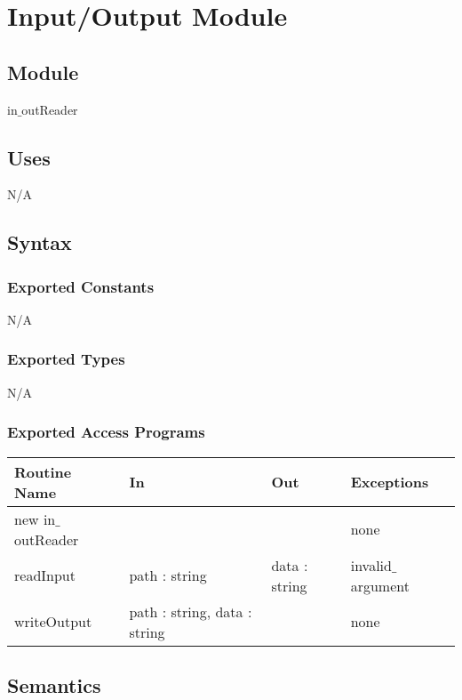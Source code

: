 \documentclass{article}
\begin{document}
\newpage

\section* {Input/Output Module}

\subsection* {Module}
in$\_$outReader

\subsection* {Uses}
N/A

\subsection* {Syntax}

\subsubsection* {Exported Constants}
N/A

\subsubsection* {Exported Types}
N/A
\subsubsection* {Exported Access Programs}

\begin{table}[!ht]
    \begin{tabular}{|l|l|l|l|}
        \hline
        Routine Name     & In             & Out    & Exceptions       \\ \hline
        new in$\_$outReader & ~              & ~      & none             \\ \hline
        readInput        & path : string         & data : string & invalid$\_$argument \\ \hline
        writeOutput      & path : string, data : string & ~      & none             \\
        \hline
    \end{tabular}
\end{table}

\subsection* {Semantics}
\end{document}
